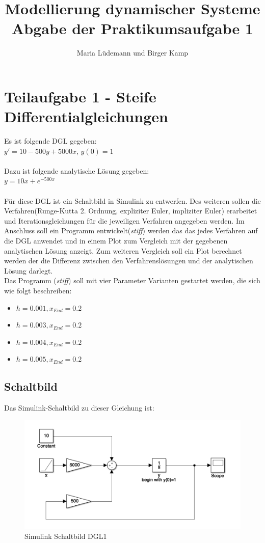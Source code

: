 \documentclass[]{scrartcl}
\title{Modellierung dynamischer Systeme  \\ Abgabe der Praktikumsaufgabe 1}
\author{Maria Lüdemann und Birger Kamp}
\begin{document}
\maketitle
{}
\tableofcontents

\section{Teilaufgabe 1 - Steife Differentialgleichungen}
Es ist folgende DGL gegeben:\\
$ y' = 10 - 500y + 5000x $,
$ y(0) = 1 $\\
\\
Dazu ist folgende analytische Lösung gegeben:\\
$ y = 10x + e^{-500x}$ \\
\\
Für diese DGL ist ein Schaltbild in Simulink zu entwerfen. Des weiteren sollen die Verfahren(Runge-Kutta 2. Ordnung, expliziter Euler, impliziter Euler) erarbeitet und Iterationsgleichungen für die jeweiligen Verfahren angegeben werden. Im Anschluss soll ein Programm entwickelt(\textit{stiff}) werden das das jedes Verfahren auf die DGL anwendet und in einem Plot zum Vergleich mit der gegebenen analytischen Lösung anzeigt. Zum weiteren Vergleich soll ein Plot berechnet werden der die Differenz zwischen den Verfahrenslösungen und der analytischen Lösung darlegt.\\
Das Programm (\textit{stiff}) soll mit vier Parameter Varianten gestartet werden, die sich wie folgt beschreiben:
\begin{itemize}
	\item $h = 0.001,  x_{End} = 0.2 $
	\item $h = 0.003,  x_{End} = 0.2 $
	\item $h = 0.004,  x_{End} = 0.2 $
	\item $h = 0.005,  x_{End} = 0.2 $
\end{itemize}

\subsection*{Schaltbild}
Das Simulink-Schaltbild zu dieser Gleichung ist:

\begin{figure}[H]
\centering
\includegraphics[width=1\linewidth]{a1_1_Schaltbild}
\caption{Simulink Schaltbild DGL1}
\label{fig:A1_1_Schaltbild}
\end{figure}
\end{document}
